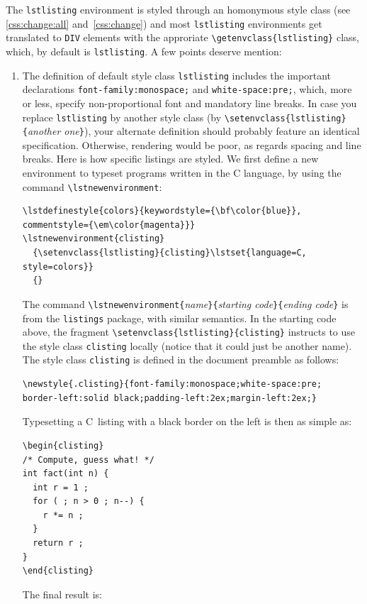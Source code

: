 The \texttt{lstlisting} environment is styled through
an homonymous style class (see \ref{css:change:all} and~\ref{css:change}) and
most \texttt{lstlisting} environments get translated to \verb+DIV+
elements with the approriate \verb+\getenvclass{lstlisting}+ class, 
which, by default is \texttt{lstlisting}.
A few points deserve mention:
\begin{enumerate}
\item The definition of default style class \texttt{lstlisting} includes
the important declarations
\verb+font-family:monospace;+ and \verb+white-space:pre;+, which, more or less,
specify non-proportional font and mandatory line breaks.
In case you replace \texttt{lstlisting} by another style class (by
\verb+\setenvclass{lstlisting}{+\textit{another one}\verb+}+), your
alternate definition should probably feature an identical
specification. Otherwise, rendering would be poor, as regards spacing
and line breaks.
\ifhevea
Here is how specific listings are styled.
We first define a new environment to typeset programs written in the C
language, by using the command \verb+\lstnewenvironment+:
\begin{verbatim}
\lstdefinestyle{colors}{keywordstyle={\bf\color{blue}}, commentstyle={\em\color{magenta}}}
\lstnewenvironment{clisting}
  {\setenvclass{lstlisting}{clisting}\lstset{language=C, style=colors}}
  {}
\end{verbatim}
The command
\verb+\lstnewenvironment{+\textit{name}\verb+}{+\textit{starting
code}\verb+}{+\textit{ending code}\verb+}+ is from the
\texttt{listings} package, with similar semantics.
In the starting code above, the fragment
\verb+\setenvclass{lstlisting}{clisting}+ instructs \hevea{} to
use the style class \texttt{clisting} locally (notice that it could just
be another name). The style class \texttt{clisting} is defined in
the document preamble as follows:
\begin{verbatim}
\newstyle{.clisting}{font-family:monospace;white-space:pre;
border-left:solid black;padding-left:2ex;margin-left:2ex;}
\end{verbatim}
Typesetting a C~listing with a black border on the left is then as
simple as:
\begin{verbatim}
\begin{clisting}
/* Compute, guess what! */
int fact(int n) {
  int r = 1 ;
  for ( ; n > 0 ; n--) {
    r *= n ;
  }
  return r ;
}
\end{clisting}
\end{verbatim}
The final result is:
\begingroup%
\end{enumerate}
